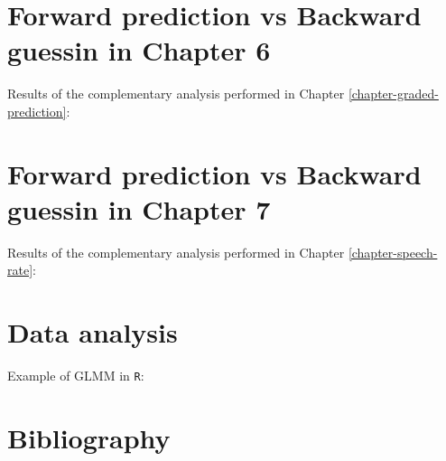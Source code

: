 \documentclass[a4paper, nobind]{templates/ociamthesis}
\begin{document}
\hypertarget{forward-prediction-vs-backward-guessin-in-chapter-6}{%
\chapter{Forward prediction vs Backward guessin in Chapter 6}\label{forward-prediction-vs-backward-guessin-in-chapter-6}}

Results of the complementary analysis performed in Chapter \ref{chapter-graded-prediction}:

\hypertarget{forward-prediction-vs-backward-guessin-in-chapter-7}{%
\chapter{Forward prediction vs Backward guessin in Chapter 7}\label{forward-prediction-vs-backward-guessin-in-chapter-7}}

Results of the complementary analysis performed in Chapter \ref{chapter-speech-rate}:

\hypertarget{data-analysis}{%
\chapter{Data analysis}\label{data-analysis}}

Example of GLMM in \texttt{R}:

\hypertarget{bibliography}{%
\chapter*{Bibliography}\label{bibliography}}
\end{document}
